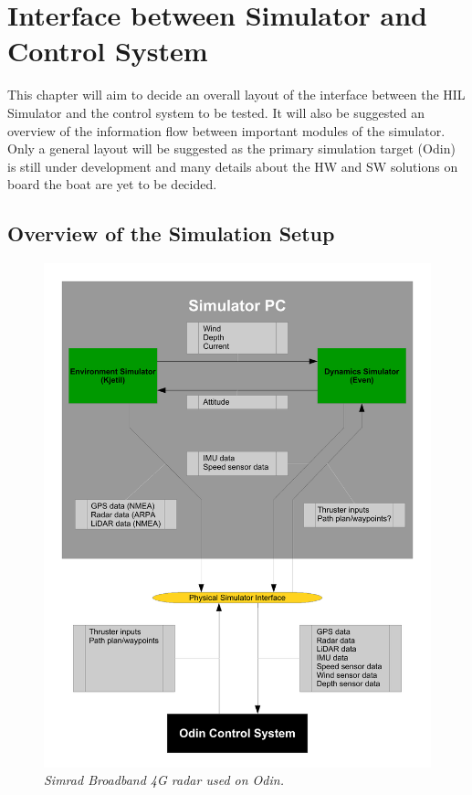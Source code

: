 \chapter{Interface between Simulator and Control System}
This chapter will aim to decide an overall layout of the interface between the HIL Simulator and the control system to be tested. It will also be suggested an overview of the information flow between important modules of the simulator. Only a general layout will be suggested as the primary simulation target (Odin) is still under development and many details about the HW and SW solutions on board the boat are yet to be decided.

\newpage
\section{Overview of the Simulation Setup}
\begin{figure}
	\vspace{-45pt}
	\begin{center}
		\includegraphics[width= 1\linewidth]{fig/Interface.pdf}
		\vspace{-40pt}
		\caption{\it{Simrad Broadband 4G radar used on Odin.}}
		\label{}
	\end{center}	
\end{figure}

